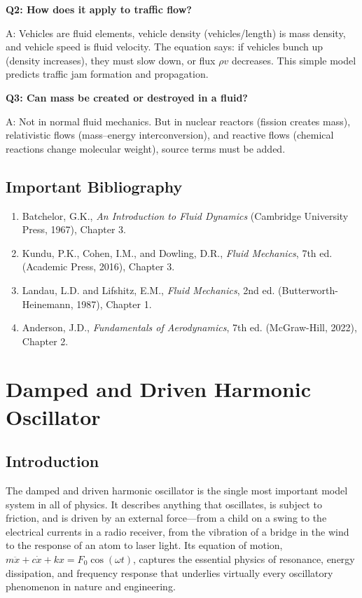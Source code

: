 \documentclass[11pt,openright]{book}
\begin{document}
\textbf{Q2: How does it apply to traffic flow?}

A: Vehicles are fluid elements, vehicle density (vehicles/length) is mass density, and vehicle speed is fluid velocity. The equation says: if vehicles bunch up (density increases), they must slow down, or flux $\rho v$ decreases. This simple model predicts traffic jam formation and propagation.

\textbf{Q3: Can mass be created or destroyed in a fluid?}

A: Not in normal fluid mechanics. But in nuclear reactors (fission creates mass), relativistic flows (mass--energy interconversion), and reactive flows (chemical reactions change molecular weight), source terms must be added.
\section*{Important Bibliography}

\begin{enumerate}
\item Batchelor, G.K., \textit{An Introduction to Fluid Dynamics} (Cambridge University Press, 1967), Chapter 3.
\item Kundu, P.K., Cohen, I.M., and Dowling, D.R., \textit{Fluid Mechanics}, 7th ed. (Academic Press, 2016), Chapter 3.
\item Landau, L.D. and Lifshitz, E.M., \textit{Fluid Mechanics}, 2nd ed. (Butterworth-Heinemann, 1987), Chapter 1.
\item Anderson, J.D., \textit{Fundamentals of Aerodynamics}, 7th ed. (McGraw-Hill, 2022), Chapter 2.
\end{enumerate}


\chapter{Damped and Driven Harmonic Oscillator}

\section*{Introduction}

The damped and driven harmonic oscillator is the single most important model system in all of physics. It describes anything that oscillates, is subject to friction, and is driven by an external force---from a child on a swing to the electrical currents in a radio receiver, from the vibration of a bridge in the wind to the response of an atom to laser light. Its equation of motion, $m\ddot{x} + c\dot{x} + kx = F_0\cos(\omega t)$, captures the essential physics of resonance, energy dissipation, and frequency response that underlies virtually every oscillatory phenomenon in nature and engineering.
\end{document}
